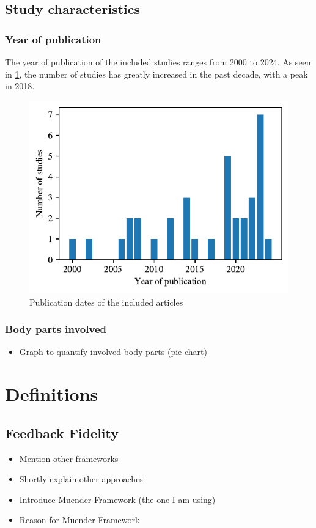 \subsection{Study characteristics}
\subsubsection{Year of publication}
The year of publication of the included studies ranges from 2000 to 2024. As seen in \ref{fig:years}, the number of studies has greatly increased in the past decade, with a peak in 2018.

\begin{figure}[htbp]
    \centering
    \includegraphics[width=\columnwidth]{figures/years.pdf} 
    \caption{Publication dates of the included articles}
    \label{fig:years}
\end{figure} 


\subsubsection{Body parts involved}
\begin{itemize}
    \item Graph to quantify involved body parts (pie chart)
\end{itemize}


\section{Definitions}
\subsection{Feedback Fidelity}
\begin{itemize}
    \item Mention other frameworks
    \item Shortly explain other approaches
    \item Introduce Muender Framework (the one I am using)
    \item Reason for Muender Framework
\end{itemize}

